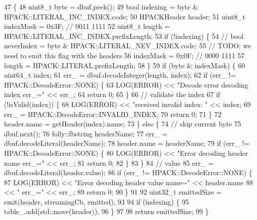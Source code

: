 \begin{DoxyCode}
47                         \{
48   uint8\_t byte = dbuf.peek();
49   \textcolor{keywordtype}{bool} indexing = byte & HPACK::LITERAL_INC_INDEX.code;
50   HPACKHeader header;
51   uint8\_t indexMask = 0x3F;  \textcolor{comment}{// 0011 1111}
52   uint8\_t length = HPACK::LITERAL_INC_INDEX.prefixLength;
53   \textcolor{keywordflow}{if} (!indexing) \{
54     \textcolor{comment}{// bool neverIndex = byte & HPACK::LITERAL\_NEV\_INDEX.code;}
55     \textcolor{comment}{// TODO: we need to emit this flag with the headers}
56     indexMask = 0x0F; \textcolor{comment}{// 0000 1111}
57     length = HPACK::LITERAL.prefixLength;
58   \}
59   \textcolor{keywordflow}{if} (byte & indexMask) \{
60     uint64\_t index;
61     err_ = dbuf.decodeInteger(length, index);
62     \textcolor{keywordflow}{if} (err_ != HPACK::DecodeError::NONE) \{
63       LOG(ERROR) << \textcolor{stringliteral}{"Decode error decoding index err\_="} << err_;
64       \textcolor{keywordflow}{return} 0;
65     \}
66     \textcolor{comment}{// validate the index}
67     \textcolor{keywordflow}{if} (!isValid(index)) \{
68       LOG(ERROR) << \textcolor{stringliteral}{"received invalid index: "} << index;
69       err_ = HPACK::DecodeError::INVALID_INDEX;
70       \textcolor{keywordflow}{return} 0;
71     \}
72     header.name = getHeader(index).name;
73   \} \textcolor{keywordflow}{else} \{
74     \textcolor{comment}{// skip current byte}
75     dbuf.next();
76     folly::fbstring headerName;
77     err_ = dbuf.decodeLiteral(headerName);
78     header.name = headerName;
79     \textcolor{keywordflow}{if} (err_ != HPACK::DecodeError::NONE) \{
80       LOG(ERROR) << \textcolor{stringliteral}{"Error decoding header name err\_="} << err_;
81       \textcolor{keywordflow}{return} 0;
82     \}
83   \}
84   \textcolor{comment}{// value}
85   err_ = dbuf.decodeLiteral(header.value);
86   \textcolor{keywordflow}{if} (err_ != HPACK::DecodeError::NONE) \{
87     LOG(ERROR) << \textcolor{stringliteral}{"Error decoding header value name="} << header.name
88                << \textcolor{stringliteral}{" err\_="} << err_;
89     \textcolor{keywordflow}{return} 0;
90   \}
91 
92   uint32\_t emittedSize = emit(header, streamingCb, emitted);
93 
94   \textcolor{keywordflow}{if} (indexing) \{
95     table_.add(std::move(header));
96   \}
97 
98   \textcolor{keywordflow}{return} emittedSize;
99 \}
\end{DoxyCode}

